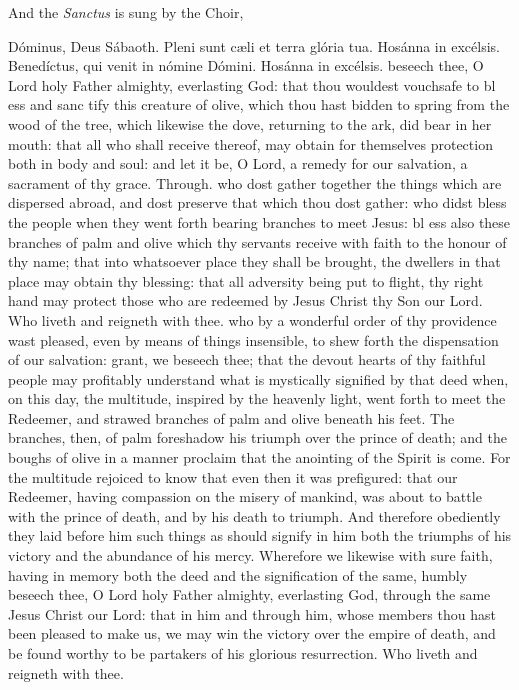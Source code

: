 \begin{rubric}
    And the \emph{Sanctus} is sung by the Choir,
\end{rubric}
{ Dóminus, Deus Sábaoth. Pleni sunt c{\ae}li et terra glória tua. Hosánna in excélsis. Benedíctus, {} qui venit in nómine Dómini. Hosánna in excélsis.}
{} beseech thee, O Lord holy Father almighty, everlasting God: that thou wouldest vouchsafe to bl {} ess and sanc {} tify this creature of olive, which thou hast bidden to spring from the wood of the tree, which likewise the dove, returning to the ark, did bear in her mouth: that all who shall receive thereof, may obtain for themselves protection both in body and soul: and let it be, O Lord, a remedy for our salvation, a sacrament
of thy grace. Through.
{} who dost gather together the things which are dispersed abroad, and dost preserve that which thou dost gather: who didst bless the people when they went forth bearing branches to meet Jesus: bl {} ess also these branches of palm and olive which thy servants receive with faith to the honour of thy name; that into whatsoever place they shall be brought, the dwellers in that place may obtain thy blessing: that all adversity being put to flight, thy right hand may protect those who are redeemed by Jesus Christ thy Son our Lord. Who liveth and reigneth with thee.
{} who by a wonderful order of thy providence wast pleased, even by means of things insensible, to shew forth the dispensation of our salvation: grant, we beseech thee; that the devout hearts of thy faithful people may profitably understand what is mystically signified by that deed when, on this day, the multitude, inspired by the heavenly light, went forth to meet the Redeemer, and strawed branches of palm and olive beneath his feet. The branches, then, of palm foreshadow his triumph over the prince of death; and the boughs of olive in a manner proclaim that the anointing of the Spirit is come. For the multitude rejoiced to know that even then it was prefigured: that our Redeemer, having compassion on the misery of mankind, was about to battle with the prince of death, and by his death to triumph. And therefore obediently they laid before him such things as should signify in him both the triumphs of his victory and the abundance of his mercy. Wherefore we likewise with sure faith, having in memory both the deed and the signification of the same, humbly beseech thee, O Lord holy Father almighty, everlasting God, through the same Jesus Christ our Lord: that in him and through him, whose members thou hast been pleased to make us, we may win the victory over the empire of death, and be found worthy to be partakers of his glorious resurrection. Who liveth and reigneth with thee.
